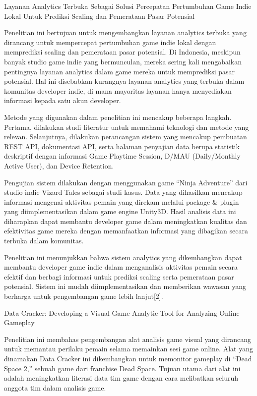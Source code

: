 Layanan Analytics Terbuka Sebagai Solusi Percepatan Pertumbuhan Game Indie Lokal Untuk Prediksi Scaling dan Pemerataan Pasar Potensial

Penelitian ini bertujuan untuk mengembangkan layanan analytics terbuka yang dirancang untuk mempercepat pertumbuhan game indie lokal dengan memprediksi scaling dan pemerataan pasar potensial. Di Indonesia, meskipun banyak studio game indie yang bermunculan, mereka sering kali mengabaikan pentingnya layanan analytics dalam game mereka untuk memprediksi pasar potensial. Hal ini disebabkan kurangnya layanan analytics yang terbuka dalam komunitas developer indie, di mana mayoritas layanan hanya menyediakan informasi kepada satu akun developer.

Metode yang digunakan dalam penelitian ini mencakup beberapa langkah. Pertama, dilakukan studi literatur untuk memahami teknologi dan metode yang relevan. Selanjutnya, dilakukan perancangan sistem yang mencakup pembuatan REST API, dokumentasi API, serta halaman penyajian data berupa statistik deskriptif dengan informasi Game Playtime Session, D/MAU (Daily/Monthly Active User), dan Device Retention.

Pengujian sistem dilakukan dengan menggunakan game “Ninja Adventure” dari studio indie Vizard Tales sebagai studi kasus. Data yang dihasilkan mencakup informasi mengenai aktivitas pemain yang direkam melalui package & plugin yang diimplementasikan dalam game engine Unity3D. Hasil analisis data ini diharapkan dapat membantu developer game dalam meningkatkan kualitas dan efektivitas game mereka dengan memanfaatkan informasi yang dibagikan secara terbuka dalam komunitas.

Penelitian ini menunjukkan bahwa sistem analytics yang dikembangkan dapat membantu developer game indie dalam menganalisis aktivitas pemain secara efektif dan berbagi informasi untuk prediksi scaling serta pemerataan pasar potensial. Sistem ini mudah diimplementasikan dan memberikan wawasan yang berharga untuk pengembangan game lebih lanjut ​​[2].

Data Cracker: Developing a Visual Game Analytic Tool for Analyzing Online Gameplay

Penelitian ini membahas pengembangan alat analisis game visual yang dirancang untuk memantau perilaku pemain selama memainkan sesi game online. Alat yang dinamakan Data Cracker ini dikembangkan untuk memonitor gameplay di “Dead Space 2,” sebuah game dari franchise Dead Space. Tujuan utama dari alat ini adalah meningkatkan literasi data tim game dengan cara melibatkan seluruh anggota tim dalam analisis game.

